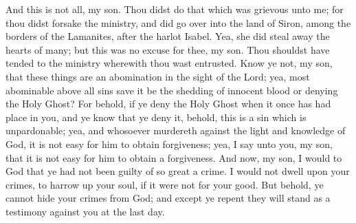 \bverse \iffalse And this is not all, my son. Thou didst do that which was grievous unto me; for thou didst forsake the ministry, and did go over into the land of Siron, among the borders of the Lamanites, after the harlot Isabel. \fi
And this is not all, my son. Thou didst do that which was grievous unto me; for thou didst forsake the ministry, and did go over into the land of Siron, among the borders of the Lamanites, after the harlot Isabel.
\bverse \iffalse Yea, she did steal away the hearts of many; but this was no excuse for thee, my son. Thou shouldst have tended to the ministry wherewith thou wast entrusted. \fi
Yea, she did steal away the hearts of many; but this was no excuse for thee, my son. Thou shouldst have tended to the ministry wherewith thou wast entrusted.
\bverse \iffalse Know ye not, my son, that these things are an abomination in the sight of the Lord; yea, most abominable above all sins save it be the shedding of innocent blood or denying the Holy Ghost? \fi
Know ye not, my son, that these things are an abomination in the sight of the Lord; yea, most abominable above all sins save it be the shedding of innocent blood or denying the Holy Ghost?
\bverse \iffalse For behold, if ye deny the Holy Ghost when it once has had place in you, and ye know that ye deny it, behold, this is a sin which is unpardonable; yea, and whosoever murdereth against the light and knowledge of God, it is not easy for him to obtain forgiveness; yea, I say unto you, my son, that it is not easy for him to obtain a forgiveness. \fi
For behold, if ye deny the Holy Ghost when it once has had place in you, and ye know that ye deny it, behold, this is a sin which is unpardonable; yea, and whosoever murdereth against the light and knowledge of God, it is not easy for him to obtain forgiveness; yea, I say unto you, my son, that it is not easy for him to obtain a forgiveness.
\bverse \iffalse And now, my son, I would to God that ye had not been guilty of so great a crime. I would not dwell upon your crimes, to harrow up your soul, if it were not for your good. \fi
And now, my son, I would to God that ye had not been guilty of so great a crime. I would not dwell upon your crimes, to harrow up your soul, if it were not for your good.
\bverse \iffalse But behold, ye cannot hide your crimes from God; and except ye repent they will stand as a testimony against you at the last day. \fi
But behold, ye cannot hide your crimes from God; and except ye repent they will stand as a testimony against you at the last day.
